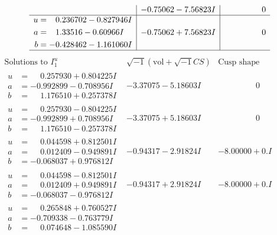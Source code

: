 \documentclass[1p]{elsarticle_modified}
\theoremstyle{definition}
\newcommand{\I}{\sqrt{-1}}
\begin{document}
$$\begin{array}{c|c|c}
 & -0.75062 - 7.56823 I & \phantom{-0.000000 } 0 \\ \hline\begin{aligned}
u &= \phantom{-}0.236702 - 0.827946 I \\
a &= \phantom{-}1.33516 - 0.60966 I \\
b &= -0.428462 - 1.161060 I\end{aligned}
 & -0.75062 + 7.56823 I & \phantom{-0.000000 } 0\\
 \hline 
 \end{array}$$\newpage$$\begin{array}{c|c|c}  
\text{Solutions to }I^u_{1}& \I (\text{vol} + \sqrt{-1}CS) & \text{Cusp shape}\\
 \hline 
\begin{aligned}
u &= \phantom{-}0.257930 + 0.804225 I \\
a &= -0.992899 - 0.708956 I \\
b &= \phantom{-}1.176510 + 0.257378 I\end{aligned}
 & -3.37075 - 5.18603 I & \phantom{-0.000000 } 0 \\ \hline\begin{aligned}
u &= \phantom{-}0.257930 - 0.804225 I \\
a &= -0.992899 + 0.708956 I \\
b &= \phantom{-}1.176510 - 0.257378 I\end{aligned}
 & -3.37075 + 5.18603 I & \phantom{-0.000000 } 0 \\ \hline\begin{aligned}
u &= \phantom{-}0.044598 + 0.812501 I \\
a &= \phantom{-}0.012409 - 0.949891 I \\
b &= -0.068037 + 0.976812 I\end{aligned}
 & -0.94317 - 2.91824 I & -8.00000 + 0. I\phantom{ +0.000000I} \\ \hline\begin{aligned}
u &= \phantom{-}0.044598 - 0.812501 I \\
a &= \phantom{-}0.012409 + 0.949891 I \\
b &= -0.068037 - 0.976812 I\end{aligned}
 & -0.94317 + 2.91824 I & -8.00000 + 0. I\phantom{ +0.000000I} \\ \hline\begin{aligned}
u &= \phantom{-}0.265848 + 0.760527 I \\
a &= -0.709338 - 0.763779 I \\
b &= \phantom{-}0.074648 - 1.085590 I\end{aligned}

\end{array}$$
\end{document}
